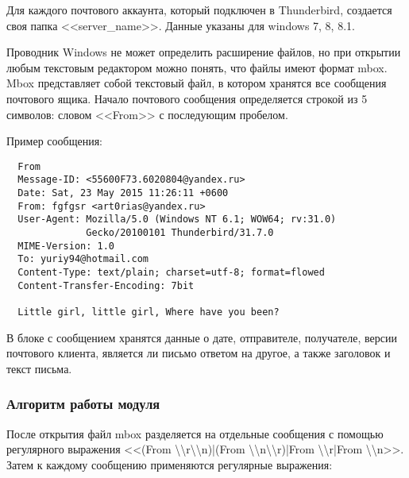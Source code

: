 Для каждого почтового аккаунта, который подключен в Thunderbird, создается своя папка <<server\_name>>. Данные указаны для windows 7, 8, 8.1.


Проводник Windows не может определить расширение файлов, но при открытии любым текстовым редактором можно понять, что файлы имеют формат mbox. Mbox представляет собой текстовый файл, в котором хранятся все сообщения почтового ящика. Начало почтового сообщения определяется строкой из 5 символов: словом <<From>> с последующим пробелом.


Пример сообщения:

\begin{verbatim}
  From 
  Message-ID: <55600F73.6020804@yandex.ru>
  Date: Sat, 23 May 2015 11:26:11 +0600
  From: fgfgsr <art0rias@yandex.ru>
  User-Agent: Mozilla/5.0 (Windows NT 6.1; WOW64; rv:31.0) 
              Gecko/20100101 Thunderbird/31.7.0
  MIME-Version: 1.0
  To: yuriy94@hotmail.com
  Content-Type: text/plain; charset=utf-8; format=flowed
  Content-Transfer-Encoding: 7bit

  Little girl, little girl, Where have you been?
\end{verbatim}

В блоке с сообщением хранятся данные о дате, отправителе, получателе, версии почтового клиента, является ли письмо ответом на другое, а также заголовок и текст письма.

\subsubsection{Алгоритм работы модуля}

После открытия файл mbox разделяется на отдельные сообщения с помощью регулярного выражения <<(From \textbackslash \textbackslash r\textbackslash \textbackslash n)|(From \textbackslash \textbackslash n\textbackslash \textbackslash r)|From \textbackslash \textbackslash r|From \textbackslash \textbackslash n>>. Затем к каждому сообщению применяются регулярные выражения:

